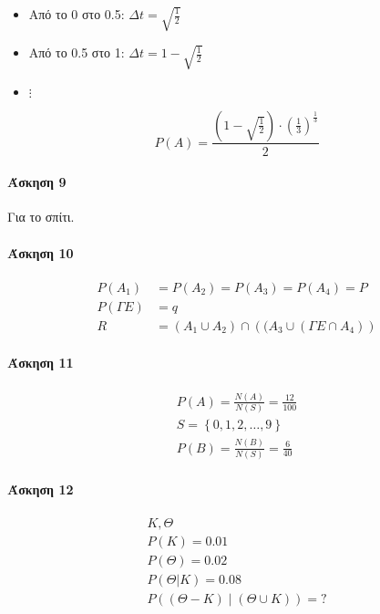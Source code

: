 \documentclass[11pt,a4paper,titlepage,draft]{article}
\begin{document}
\begin{itemize}
\item Από το 0 στο 0.5: \(\Delta t = \sqrt{\frac{1}{2}} \)
\item Από το 0.5 στο 1: \(\Delta t = 1-\sqrt{\frac{1}{2}} \)
\item \(\vdots\)
\end{itemize}

\[ 
P(A)=\frac{(1-\sqrt{\frac{1}{2}})\cdot\left( \frac{1}{3} \right)^\frac{1}{3}}{2}
\]

\paragraph{Άσκηση 9}
Για το σπίτι.

\paragraph{Άσκηση 10}

\begin{align*}
P(A_1)&=P(A_2)=P(A_3)=P(A_4)=P \\
P( \Gamma E) &= q \\
R &= (A_1 \cup A_2) \cap \left( (A_3 \cup (  \Gamma E \cap A_4)  \right)
\end{align*}

\paragraph{Άσκηση 11}
\begin{gather*}
P(A) = \frac{N(A)}{N(S)} = \frac{12}{100} \\
S =  \left\lbrace 0,1,2,\dots,9 \right\rbrace \\
P(B) = \frac{N(B)}{N(S)} = \frac{6}{40}
\end{gather*}

\paragraph{Άσκηση 12}
\begin{gather*}
K, \Theta\\
P(K) = 0.01 \\
P(\Theta) = 0.02 \\
P(\Theta | K) = 0.08 \\
P \left(  (\Theta - K) \middle| (\Theta \cup K) \right) = ?
\end{gather*}
\end{document}
